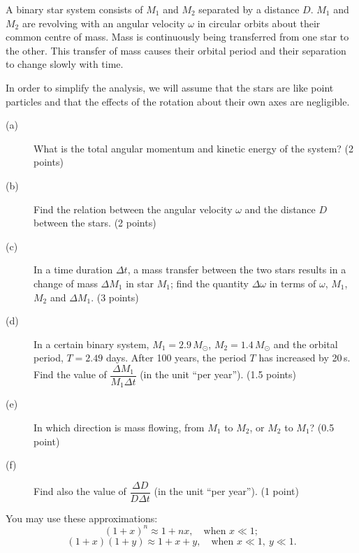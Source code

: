 A binary star system consists of $M_1$ and $M_2$ separated by a distance $D$.
$M_1$ and $M_2$ are revolving with an angular velocity $\omega$ in circular
orbits about their common centre of mass. Mass is continuously being
transferred from one star to the other. This transfer of mass causes their
orbital period and their separation to change slowly with time.

In order to simplify the analysis, we will assume that the stars are like
point particles and that the effects of the rotation about their own axes are
negligible.

\begin{description}
\item[(a)] What is the total angular momentum and kinetic energy of the
  system? \hfill(2 points)
\item[(b)] Find the relation between the angular velocity $\omega$ and the
  distance $D$ between the stars. \hfill(2 points)
\item[(c)] In a time duration $\Delta t$, a mass transfer between the two
  stars results in a change of mass $\Delta M_1$ in star $M_1$; find the
  quantity $\Delta\omega$ in terms of $\omega$, $M_1$, $M_2$ and
  $\Delta M_1$. \hfill(3 points)
\item[(d)] In a certain binary system, $M_1 = 2.9\,M_\odot$,
  $M_2 = 1.4\,M_\odot$ and the orbital period, $T = 2.49$ days. After 100
  years, the period $T$ has increased by 20\,s. Find the value of
  $\dfrac{\Delta M_1}{M_1 \Delta t}$ (in the unit ``per year'').
  \hfill(1.5 points)
\item[(e)] In which direction is mass flowing, from $M_1$ to $M_2$, or $M_2$
  to $M_1$? \hfill(0.5 point)
\item[(f)] Find also the value of $\dfrac{\Delta D}{D \Delta t}$ (in the
  unit ``per year''). \hfill(1 point)
\end{description}

You may use these approximations:
\[ (1+x)^n \approx 1 + nx, \quad \mbox{when } x \ll 1; \]
\[ (1+x)(1+y) \approx 1 + x + y, \quad \mbox{when } x \ll 1,\ y \ll 1. \]
